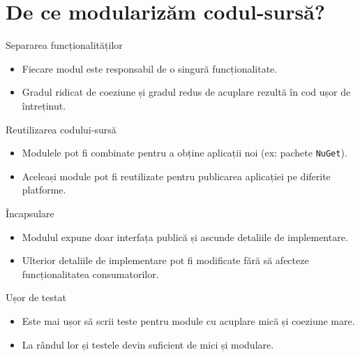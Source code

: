 \documentclass[presentation]{beamer}
\begin{document}
\section{De ce modularizăm codul-sursă?}
\label{sec:orgf7b30f3}
\begin{frame}[label={sec:orgdb072d7}]{Separarea funcționalităților}
\begin{itemize}
\item Fiecare modul este responsabil de o singură funcționalitate.
\item Gradul ridicat de coeziune și gradul redus de acuplare rezultă în cod ușor de întreținut.
\end{itemize}
\end{frame}
\begin{frame}[label={sec:orga3b644c},fragile]{Reutilizarea codului-sursă}
 \begin{itemize}
\item Modulele pot fi combinate pentru a obține aplicații noi (ex: pachete \texttt{NuGet}).
\item Aceleași module pot fi reutilizate pentru publicarea aplicației pe diferite platforme.
\end{itemize}
\end{frame}
\begin{frame}[label={sec:org2ca9c6b}]{Încapsulare}
\begin{itemize}
\item Modulul expune doar interfața publică și ascunde detaliile de implementare.
\item Ulterior detaliile de implementare pot fi modificate fără să afecteze funcționalitatea consumatorilor.
\end{itemize}
\end{frame}
\begin{frame}[label={sec:org6694515}]{Ușor de testat}
\begin{itemize}
\item Este mai ușor să scrii teste pentru module cu acuplare mică și coeziune mare.
\item La rândul lor și testele devin suficient de mici și modulare.
\end{itemize}
\end{frame}
\end{document}

